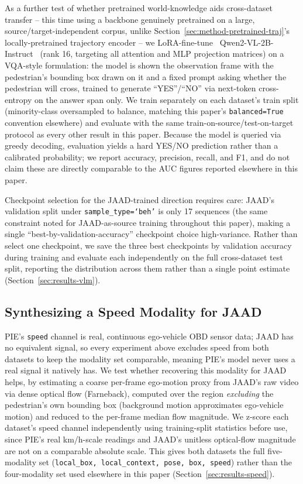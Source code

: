 As a further test of whether pretrained world-knowledge aids
cross-dataset transfer -- this time using a backbone genuinely
pretrained on a large, source/target-independent corpus, unlike
Section~\ref{sec:method-pretrained-traj}'s locally-pretrained
trajectory encoder -- we LoRA-fine-tune~\cite{hu2022lora}
Qwen2-VL-2B-Instruct~\cite{qwen2vl} (rank 16, targeting all attention
and MLP projection matrices) on a VQA-style formulation: the model is
shown the observation frame with the pedestrian's bounding box drawn
on it and a fixed prompt asking whether the pedestrian will cross,
trained to generate ``YES''/``NO'' via next-token cross-entropy on the
answer span only. We train separately on each dataset's train split
(minority-class oversampled to balance, matching this paper's
\texttt{balanced=True} convention elsewhere) and evaluate with the same
train-on-source/test-on-target protocol as every other result in this
paper. Because the model is queried via greedy decoding, evaluation
yields a hard YES/NO prediction rather than a calibrated probability;
we report accuracy, precision, recall, and F1, and do not claim these
are directly comparable to the AUC figures reported elsewhere in this
paper.

Checkpoint selection for the JAAD-trained direction requires care:
JAAD's validation split under \texttt{sample\_type=`beh'} is only 17
sequences (the same constraint noted for JAAD-as-source training
throughout this paper), making a single ``best-by-validation-accuracy''
checkpoint choice high-variance. Rather than select one checkpoint, we
save the three best checkpoints by validation accuracy during training
and evaluate each independently on the full cross-dataset test split,
reporting the distribution across them rather than a single point
estimate (Section~\ref{sec:results-vlm}).

\subsection{Synthesizing a Speed Modality for JAAD}
\label{sec:method-speed}

PIE's \texttt{speed} channel is real, continuous ego-vehicle OBD sensor
data; JAAD has no equivalent signal, so every experiment above excludes
speed from both datasets to keep the modality set comparable, meaning
PIE's model never uses a real signal it natively has. We test whether
recovering this modality for JAAD helps, by estimating a coarse
per-frame ego-motion proxy from JAAD's raw video via dense optical flow
(Farneback), computed over the region \emph{excluding} the pedestrian's
own bounding box (background motion approximates ego-vehicle motion)
and reduced to the per-frame median flow magnitude. We z-score each
dataset's speed channel independently using training-split statistics
before use, since PIE's real km/h-scale readings and JAAD's unitless
optical-flow magnitude are not on a comparable absolute scale. This
gives both datasets the full five-modality set
(\texttt{local\_box, local\_context, pose, box, speed}) rather than the
four-modality set used elsewhere in this paper
(Section~\ref{sec:results-speed}).

